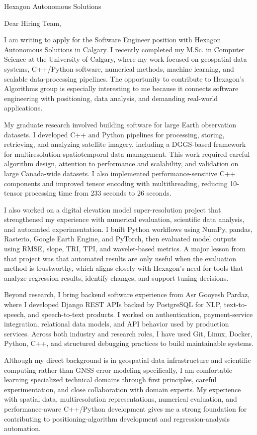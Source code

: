 \documentclass[11pt]{letter}
\begin{document}
\begin{letter}{Hexagon Autonomous Solutions}

\opening{Dear Hiring Team,}

I am writing to apply for the Software Engineer position with Hexagon Autonomous Solutions in Calgary. I recently completed my M.Sc. in Computer Science at the University of Calgary, where my work focused on geospatial data systems, C++/Python software, numerical methods, machine learning, and scalable data-processing pipelines. The opportunity to contribute to Hexagon's Algorithms group is especially interesting to me because it connects software engineering with positioning, data analysis, and demanding real-world applications.

My graduate research involved building software for large Earth observation datasets. I developed C++ and Python pipelines for processing, storing, retrieving, and analyzing satellite imagery, including a DGGS-based framework for multiresolution spatiotemporal data management. This work required careful algorithm design, attention to performance and scalability, and validation on large Canada-wide datasets. I also implemented performance-sensitive C++ components and improved tensor encoding with multithreading, reducing 10-tensor processing time from 233 seconds to 26 seconds.

I also worked on a digital elevation model super-resolution project that strengthened my experience with numerical evaluation, scientific data analysis, and automated experimentation. I built Python workflows using NumPy, pandas, Rasterio, Google Earth Engine, and PyTorch, then evaluated model outputs using RMSE, slope, TRI, TPI, and wavelet-based metrics. A major lesson from that project was that automated results are only useful when the evaluation method is trustworthy, which aligns closely with Hexagon's need for tools that analyze regression results, identify changes, and support tuning decisions.

Beyond research, I bring backend software experience from Asr Gooyesh Pardaz, where I developed Django REST APIs backed by PostgreSQL for NLP, text-to-speech, and speech-to-text products. I worked on authentication, payment-service integration, relational data models, and API behavior used by production services. Across both industry and research roles, I have used Git, Linux, Docker, Python, C++, and structured debugging practices to build maintainable systems.

Although my direct background is in geospatial data infrastructure and scientific computing rather than GNSS error modeling specifically, I am comfortable learning specialized technical domains through first principles, careful experimentation, and close collaboration with domain experts. My experience with spatial data, multiresolution representations, numerical evaluation, and performance-aware C++/Python development gives me a strong foundation for contributing to positioning-algorithm development and regression-analysis automation.


\end{letter}
\end{document}
